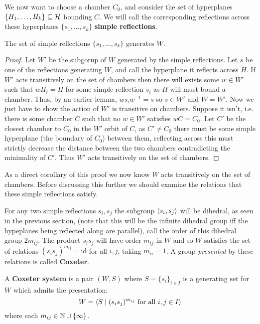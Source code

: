 \documentclass[../main.tex]{subfiles}
\begin{document}
We now want to choose a chamber $C_0$, and consider the set of hyperplanes $\{H_1,\ldots,H_k\}\subseteq \mathcal{H}$ bounding $C$. We will call the corresponding reflections across these hyperplanes $\{s_1,\ldots,s_k\}$ \textbf{simple reflections}.

\begin{theorem}
    The set of simple reflections $\{s_1,\ldots, s_k\}$ generates $W$.
    \begin{proof}
        Let $W'$ be the subgorup of $W$ generated by the simple reflections. Let $s$ be one of the reflections generating $W$, and call the hyperplane it reflects across $H$. If $W'$ acts transitively on the set of chambers then there will exists some $w\in W'$ such that $wH_i=H$ for some simple reflection $s_i$ as $H$ will must bound a chamber. Thus, by an earlier lemma, $ws_iw^{-1} = s$ so $s\in W'$ and $W=W'$.
        Now we just have to show the action of $W'$ is transitive on chambers. Suppose it isn't, i.e. there is some chamber $C$ such that no $w\in W'$ satisfies $wC=C_0$. Let $C'$ be the closest chamber to $C_0$ in the $W'$ orbit of $C$, as $C'\neq C_0$ there must be some simple hyperplane (the boundary of $C_0$) between them, reflecting across this must strictly decrease the distance between the two chambers contradicting the minimality of $C'$. Thus $W'$ acts transitively on the set of chambers.
    \end{proof}
\end{theorem}

As a direct corollary of this proof we now know $W$ acts transitively on the set of chambers. Before discussing this further we should examine the relations that these simple reflections satisfy.

For any two simple reflections $s_i,s_j$ the subgroup $\left\langle s_i,s_j \right\rangle$ will be dihedral, as seen in the previous section, (note that this will be the infinite dihedral group iff the hypeplanes being reflected along are parallel), call the order of this dihedral group $2m_{ij}$. The product $s_i s_j$ will have order $m_{ij}$ in $W$ and so $W$ satisfies the set of relations $(s_is_j)^{m_{ij}}=\text{id}$ for all $i,j$, taking $m_{ii}=1$. A group \textit{presented} by these relations is called \textbf{Coxeter}.

\begin{definition}
    A \textbf{Coxeter system} is a pair $(W,S)$ where $S=\{s_i\}_{i\in I}$ is a generating set for $W$ which admits the presentation:\[
        W = \left\langle S \mid (s_is_j)^{m_{ij}} \text{ for all } i,j\in I \right\rangle
    \]
    where each $m_{ij}\in \mathbb{N}\cup\{\infty\}$.
\end{definition}
\end{document}
